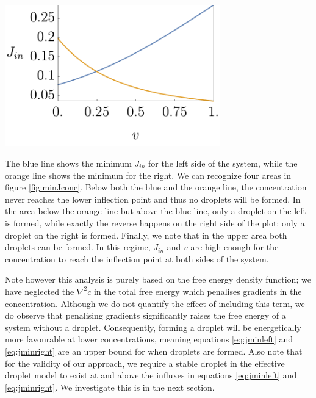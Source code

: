 \documentclass{Dissertate}
\let\origfigure\figure
\let\endorigfigure\endfigure
\renewenvironment{figure}[1][2] {
    \expandafter\origfigure\expandafter[H]
} {
    \endorigfigure
}
\begin{document}
\begin{figure}
\hypertarget{fig:minJconc}{%
\centering
\includegraphics[width=0.7\textwidth]{source/figures/pdf/Jmin.pdf}
\caption{The minimum required influx for a given advection speed to form a droplet on the left (blue line) and right (orange line). Plotting parameters are \(a=0.1, D=1 ,c_0^-=0.1,c_0^+=0.9, L=5\).}\label{fig:minJconc}
}
\end{figure}

The blue line shows the minimum \(J_{in}\) for the left side of the
system, while the orange line shows the minimum for the right. We can
recognize four areas in figure \ref{fig:minJconc}. Below both the
blue and the orange line, the concentration never reaches the lower
inflection point and thus no droplets will be formed. In the area below
the orange line but above the blue line, only a droplet on the left is
formed, while exactly the reverse happens on the right side of the plot:
only a droplet on the right is formed. Finally, we note that in the
upper area both droplets can be formed. In this regime, \(J_{in}\) and
\(v\) are high enough for the concentration to reach the inflection
point at both sides of the system.

Note however this analysis is purely based on the free energy density function; we have neglected the $\nabla^2 c$ in the total free energy which penalises gradients in the concentration. Although we do not quantify the effect of including this term, we do observe that penalising gradients significantly raises the free energy of a system without a droplet. Consequently, forming a droplet will be energetically more favourable at lower concentrations, meaning equations \ref{eq:jminleft} and \ref{eq:jminright} are an upper bound for when droplets are formed. Also note that for the validity of our approach, we require a stable droplet in the effective droplet model to exist at and above the influxes in equations \ref{eq:jminleft} and \ref{eq:jminright}. We investigate this is in the next section.
\end{document}
